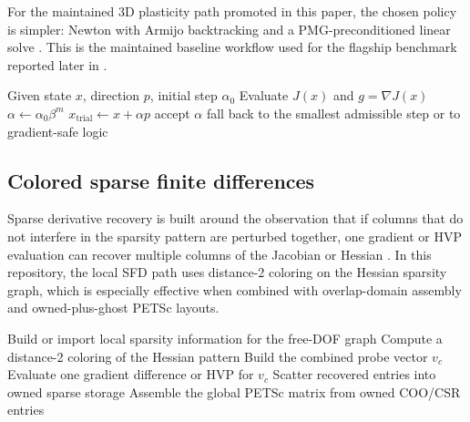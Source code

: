 For the maintained 3D plasticity path promoted in this paper, the chosen policy
is simpler: Newton with Armijo backtracking and a PMG-preconditioned
 linear solve \citep[Sec.~3.1]{nocedal2006numerical}. This is the
maintained baseline workflow used for the flagship benchmark reported later in
.

\begin{algorithm}[H]
\caption{Armijo line search used in maintained Newton solves}
\begin{algorithmic}[1]
\State Given state $x$, direction $p$, initial step $\alpha_0$
\State Evaluate $J(x)$ and $g = \nabla J(x)$
  \State $\alpha \gets \alpha_0 \beta^m$
  \State $x_{\mathrm{trial}} \gets x + \alpha p$
    \State accept $\alpha$
    \State \Return
  \EndIf
\EndFor
\State fall back to the smallest admissible step or to gradient-safe logic
\end{algorithmic}
\end{algorithm}

\subsection{Colored sparse finite differences}

Sparse derivative recovery is built around the observation that if columns that
do not interfere in the sparsity pattern are perturbed together, one gradient
or HVP evaluation can recover multiple columns of the Jacobian or Hessian
\citep{curtis1974sparsejacobian,coleman1984sparsehessian}. In this repository,
the local SFD path uses distance-2 coloring on the Hessian sparsity graph,
which is especially effective when combined with overlap-domain assembly and
owned-plus-ghost PETSc layouts.

\begin{algorithm}[H]
\caption{Distributed colored Hessian recovery}
\begin{algorithmic}[1]
\State Build or import local sparsity information for the free-DOF graph
\State Compute a distance-2 coloring of the Hessian pattern
  \State Build the combined probe vector $v_c$
  \State Evaluate one gradient difference or HVP for $v_c$
  \State Scatter recovered entries into owned sparse storage
\EndFor
\State Assemble the global PETSc matrix from owned COO/CSR entries
\end{algorithmic}
\end{algorithm}

